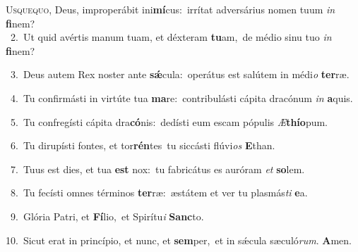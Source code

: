\lettrine{\initial\textcolor{\initialcolor}{U}}{squequo,} Deus, improperábit ini\-\textbf{mí}\-cus:~\star irrítat adversárius nomen tuum \textit{in} \textbf{fi}\-nem?\\
{\numbfont\textcolor{\numbcolor}{~2.}}~Ut quid avértis manum tuam, et déxteram \textbf{tu}\-am,~\star de médio sinu tuo \textit{in} \textbf{fi}\-nem?\par
{\numbfont\textcolor{\numbcolor}{~3.}}~Deus autem Rex noster ante \textbf{sǽ}\-cula:~\star operátus est salútem in médi\textit{o} \textbf{ter}\-ræ.\par
{\numbfont\textcolor{\numbcolor}{~4.}}~Tu confirmásti in virtúte tua \textbf{ma}\-re:~\star contribulásti cápita dracónum \textit{in} \textbf{a}\-quis.\par
{\numbfont\textcolor{\numbcolor}{~5.}}~Tu confregísti cápita dra\-\textbf{có}\-nis:~\star dedísti eum escam pópulis \textit{Æ}\-\textbf{thí}\textbf{o}pum.\par
{\numbfont\textcolor{\numbcolor}{~6.}}~Tu dirupísti fontes, et tor\-\textbf{rén}\-tes~\star tu siccásti flúvi\textit{os} \textbf{E}\-than.\par
{\numbfont\textcolor{\numbcolor}{~7.}}~Tuus est dies, et tua \textbf{est} nox:~\star tu fabricátus es auróram \textit{et} \textbf{so}\-lem.\par
{\numbfont\textcolor{\numbcolor}{~8.}}~Tu fecísti omnes términos \textbf{ter}\-ræ:~\star æstátem et ver tu plasmás\textit{ti} \textbf{e}\-a.\par
{\numbfont\textcolor{\numbcolor}{~9.}}~Glória Patri, et \textbf{Fí}\-lio,~\star et Spirítu\textit{i} \textbf{Sanc}\-to.\par
{\numbfont\textcolor{\numbcolor}{10.}}~Sicut erat in princípio, et nunc, et \textbf{sem}\-per,~\star et in sǽcula sæculó\-\textit{rum}\-. \textbf{A}\-men.\par
